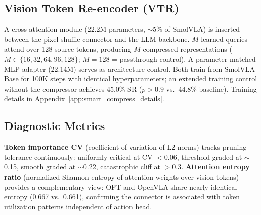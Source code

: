 \subsection{Vision Token Re-encoder (VTR)}
\label{sec:smart_compress_setup}

A cross-attention module (22.2M parameters, $\sim$5\% of SmolVLA) is inserted between the pixel-shuffle connector and the LLM backbone. $M$ learned queries attend over 128 source tokens, producing $M$ compressed representations ($M \in \{16, 32, 64, 96, 128\}$; $M{=}128$ = passthrough control). A parameter-matched MLP adapter (22.14M) serves as architecture control. Both train from SmolVLA-Base for 100K steps with identical hyperparameters; an extended training control without the compressor achieves 45.0\% SR ($p > 0.9$ vs.\ 44.8\% baseline). Training details in Appendix~\ref{app:smart_compress_details}.

\subsection{Diagnostic Metrics}
\label{sec:diagnostic_metrics}

\textbf{Token importance CV} (coefficient of variation of L2 norms) tracks pruning tolerance continuously: uniformly critical at CV $< 0.06$, threshold-graded at $\sim$0.15, smooth graded at $\sim$0.22, catastrophic cliff at $> 0.3$. \textbf{Attention entropy ratio} (normalized Shannon entropy of attention weights over vision tokens) provides a complementary view: OFT and OpenVLA share nearly identical entropy (0.667 vs.\ 0.661), confirming the connector is associated with token utilization patterns independent of action head.
